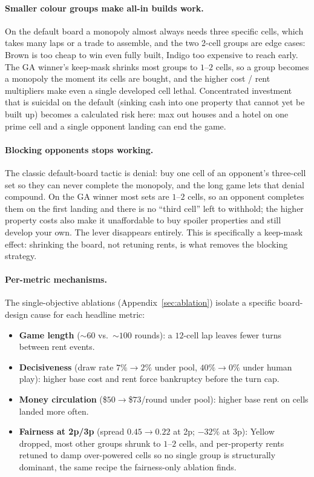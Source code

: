 \documentclass[10pt]{article}
\begin{document}
\paragraph{Smaller colour groups make all-in builds work.}
On the default board a monopoly almost always needs three specific
cells, which takes many laps or a trade to assemble, and the two
2-cell groups are edge cases: Brown is too cheap to win even fully
built, Indigo too expensive to reach early. The GA winner's keep-mask
shrinks most groups to $1$--$2$ cells, so a group becomes a monopoly
the moment its cells are bought, and the higher cost / rent
multipliers make even a single developed cell lethal. Concentrated
investment that is suicidal on the default (sinking cash into one
property that cannot yet be built up) becomes a calculated risk here:
max out houses and a hotel on one prime cell and a single opponent
landing can end the game.

\paragraph{Blocking opponents stops working.} The classic default-board
tactic is denial: buy one cell of an opponent's three-cell set so they
can never complete the monopoly, and the long game lets that denial
compound. On the GA winner most sets are $1$--$2$ cells, so an opponent
completes them on the first landing and there is no ``third cell''
left to withhold; the higher property costs also make it unaffordable
to buy spoiler properties and still develop your own. The lever
disappears entirely. This is specifically a keep-mask effect: shrinking
the board, not retuning rents, is what removes the blocking strategy.

\paragraph{Per-metric mechanisms.} The single-objective ablations
(Appendix~\ref{sec:ablation}) isolate a specific board-design cause for
each headline metric:
\begin{itemize}[leftmargin=1.4em,itemsep=2pt]
  \item \textbf{Game length} ($\sim$$60$ vs.\ $\sim$$100$ rounds):
    a $12$-cell lap leaves fewer turns between rent events.
  \item \textbf{Decisiveness} (draw rate $7\%\!\to\!2\%$ under
    pool, $40\%\!\to\!0\%$ under human play): higher base cost and
    rent force bankruptcy before the turn cap.
  \item \textbf{Money circulation} (\$$50\!\to\!$\$$73$/round
    under pool): higher base rent on cells landed more often.
  \item \textbf{Fairness at 2p/3p} (spread $0.45\!\to\!0.22$ at 2p;
    $-32\%$ at 3p): Yellow dropped, most other groups shrunk to
    $1$--$2$ cells, and per-property rents retuned to damp
    over-powered cells so no single group is structurally dominant,
    the same recipe the fairness-only ablation finds.
\end{itemize}
\end{document}
